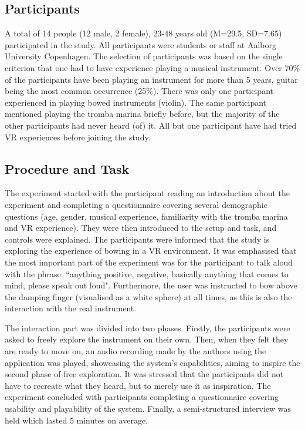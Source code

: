 \subsection{Participants}

A total of 14 people (12 male, 2 female), 23-48 years old (M=29.5, SD=7.65)  participated in the study. All participants were students or staff at Aalborg University Copenhagen. The selection of participants was based on the single criterion that one had to have experience playing a musical instrument. Over 70\% of the participants have been playing an instrument for more than 5 years, guitar being the most common occurrence (25\%). There was only one participant experienced in playing bowed instruments (violin). The same participant mentioned playing the tromba marina briefly before, but the majority of the other participants had never heard (of) it. All but one participant have had tried VR experiences before joining the study. 

\subsection{Procedure and Task}

The experiment started with the participant reading an introduction about the experiment and completing a questionnaire covering several demographic questions (age, gender, musical experience, familiarity with the tromba marina and VR experience). They were then introduced to the setup and task, and controls were explained. The participants were informed that the study is exploring the experience of bowing in a VR environment. It was emphasised that the most important part of the experiment was for the participant to talk aloud with the phrase: ``anything positive, negative, basically anything that comes to mind, please speak out loud". Furthermore, the user was instructed to bow above the damping finger (visualised as a white sphere) at all times, as this is also the interaction with the real instrument. 

The interaction part was divided into two phases. Firstly, the participants were asked to freely explore the instrument on their own. Then, when they felt they are ready to move on, an audio recording made by the authors using the application was played, showcasing the system's capabilities, aiming to inspire the second phase of free exploration. It was stressed that the participants did not have to recreate what they heard, but to merely use it as inspiration. The experiment concluded with participants completing a questionnaire covering usability and playability of the system. Finally, a semi-structured interview was held which lasted 5 minutes on average. 

